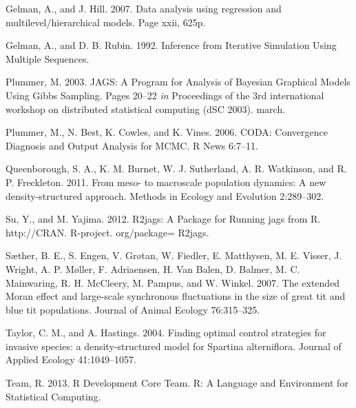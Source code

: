 \documentclass[author-year, 12pt,review]{components/elsarticle} %
\begin{document}
Gelman, A., and J. Hill. 2007. Data analysis using regression and
multilevel/hierarchical models. Page xxii, 625p.

Gelman, A., and D. B. Rubin. 1992. Inference from Iterative Simulation
Using Multiple Sequences.

Plummer, M. 2003. JAGS: A Program for Analysis of Bayesian Graphical
Models Using Gibbs Sampling. Pages 20--22 \emph{in} Proceedings of the
3rd international workshop on distributed statistical computing (dSC
2003). march.

Plummer, M., N. Best, K. Cowles, and K. Vines. 2006. CODA: Convergence
Diagnosis and Output Analysis for MCMC. R News 6:7--11.

Queenborough, S. A., K. M. Burnet, W. J. Sutherland, A. R. Watkinson,
and R. P. Freckleton. 2011. From meso- to macroscale population
dynamics: A new density-structured approach. Methods in Ecology and
Evolution 2:289--302.

Su, Y., and M. Yajima. 2012. R2jags: A Package for Running jags from R.
http://CRAN. R-project. org/package= R2jags.

Sæther, B. E., S. Engen, V. Grøtan, W. Fiedler, E. Matthysen, M. E.
Visser, J. Wright, A. P. Møller, F. Adriaensen, H. {Van Balen}, D.
Balmer, M. C. Mainwaring, R. H. McCleery, M. Pampus, and W. Winkel.
2007. The extended Moran effect and large-scale synchronous fluctuations
in the size of great tit and blue tit populations. Journal of Animal
Ecology 76:315--325.

Taylor, C. M., and A. Hastings. 2004. Finding optimal control strategies
for invasive species: a density-structured model for Spartina
alterniflora. Journal of Applied Ecology 41:1049--1057.

Team, R. 2013. R Development Core Team. R: A Language and Environment
for Statistical Computing.
\end{document}
